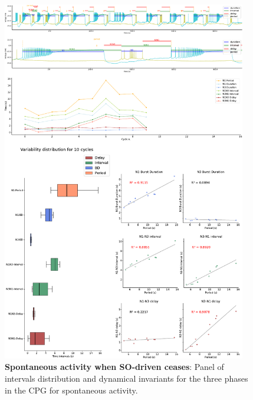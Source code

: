 \begin{figure}[htbp]
	\centering
	\includegraphics[width=0.95\textwidth]{./invariants/data/SUSSEX/prep4_so_no_driven/images/panel_with_intervals.pdf}
	\caption{\textbf{Spontaneous activity when SO-driven ceases}: Panel of intervals distribution and dynamical invariants for the three phases in the CPG for spontaneous activity.}
	\label{fig:no so spontaneous invariants}
\end{figure}
 	 
 


